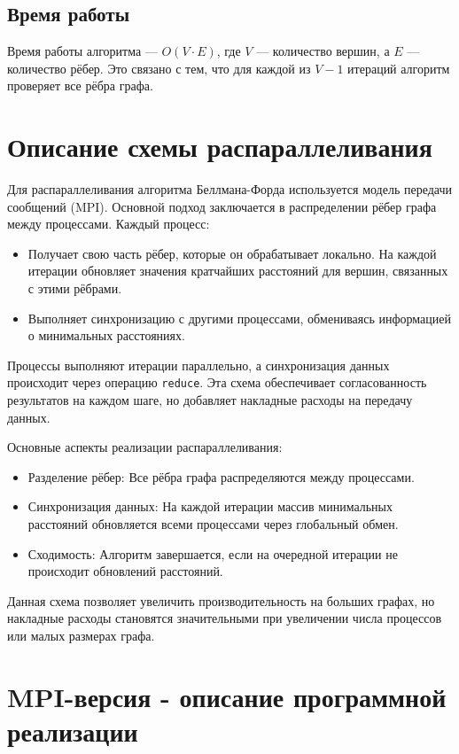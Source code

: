 \documentclass[12pt]{article}
\begin{document}
\subsection{Время работы}
Время работы алгоритма — $O(V \cdot E)$, где $V$ — количество вершин, а $E$ — количество рёбер. Это связано с тем, что для каждой из $V - 1$ итераций алгоритм проверяет все рёбра графа.


\newpage
\section*{Описание схемы распараллеливания}

Для распараллеливания алгоритма Беллмана-Форда используется модель передачи сообщений (MPI). Основной подход заключается в распределении рёбер графа между процессами. Каждый процесс: \begin{itemize}
    \item Получает свою часть рёбер, которые он обрабатывает локально.
На каждой итерации обновляет значения кратчайших расстояний для вершин, связанных с этими рёбрами.
    \item Выполняет синхронизацию с другими процессами, обмениваясь информацией о минимальных расстояниях.
\end{itemize}
Процессы выполняют итерации параллельно, а синхронизация данных происходит через операцию \texttt{reduce}. Эта схема обеспечивает согласованность результатов на каждом шаге, но добавляет накладные расходы на передачу данных.

Основные аспекты реализации распараллеливания: \begin{itemize}

 \item Разделение рёбер: Все рёбра графа распределяются между процессами.
 \item Синхронизация данных: На каждой итерации массив минимальных расстояний обновляется всеми процессами через глобальный обмен.
 \item Сходимость: Алгоритм завершается, если на очередной итерации не происходит обновлений расстояний.
 \end{itemize}
Данная схема позволяет увеличить производительность на больших графах, но накладные расходы становятся значительными при увеличении числа процессов или малых размерах графа.



\newpage
\section*{MPI-версия - описание программной реализации}
\end{document}
